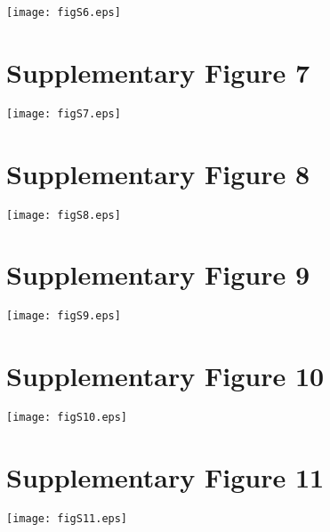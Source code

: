 \documentclass[12pt]{article}
\begin{document}
\begin{figure*}[h!]
\centerline{
	\texttt{[image: figS6.eps]}} 
	
\end{figure*}

\newpage
\section*{Supplementary Figure 7}

\begin{figure*}[h!]
\centerline{
	\texttt{[image: figS7.eps]}} 
	
\end{figure*}

\newpage
\section*{Supplementary Figure 8}

\begin{figure*}[h!]
\centerline{
	\texttt{[image: figS8.eps]}} 
	
\end{figure*}

\newpage
\section*{Supplementary Figure 9}

\begin{figure*}[h!]
\centerline{
	\texttt{[image: figS9.eps]}} 
	
\end{figure*}

\newpage
\section*{Supplementary Figure 10}

\begin{figure*}[h!]
\centerline{
	\texttt{[image: figS10.eps]}} 
	
\end{figure*}

\newpage
\section*{Supplementary Figure 11}

\begin{figure*}[h!]
\centerline{
	\texttt{[image: figS11.eps]}} 
	
\end{figure*}
\end{document}
